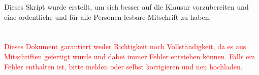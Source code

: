 Dieses Skript wurde erstellt, um sich besser auf die Klausur vorzubereiten und eine ordentliche und für alle Personen lesbare Mitschrift zu haben. \\
\qquad\\
\qquad\\
\textcolor{red}{\Large{Dieses Dokument garantiert weder Richtigkeit noch Vollständigkeit, da es aus Mitschriften gefertigt wurde und dabei immer Fehler entstehen können. Falls ein Fehler enthalten ist, bitte melden oder selbst korrigieren und neu hochladen.}}